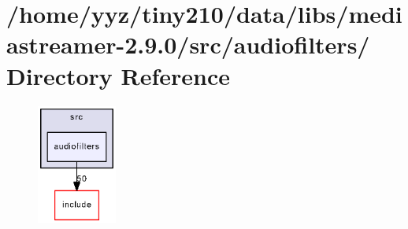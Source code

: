 \section{/home/yyz/tiny210/data/libs/mediastreamer-\/2.9.0/src/audiofilters/ Directory Reference}
\label{dir_326692c03b6bef1afdaa95d9c14d33ab}


\nopagebreak
\begin{figure}[H]
\begin{center}
\leavevmode
\includegraphics[width=74pt]{dir_326692c03b6bef1afdaa95d9c14d33ab_dep}
\end{center}
\end{figure}
